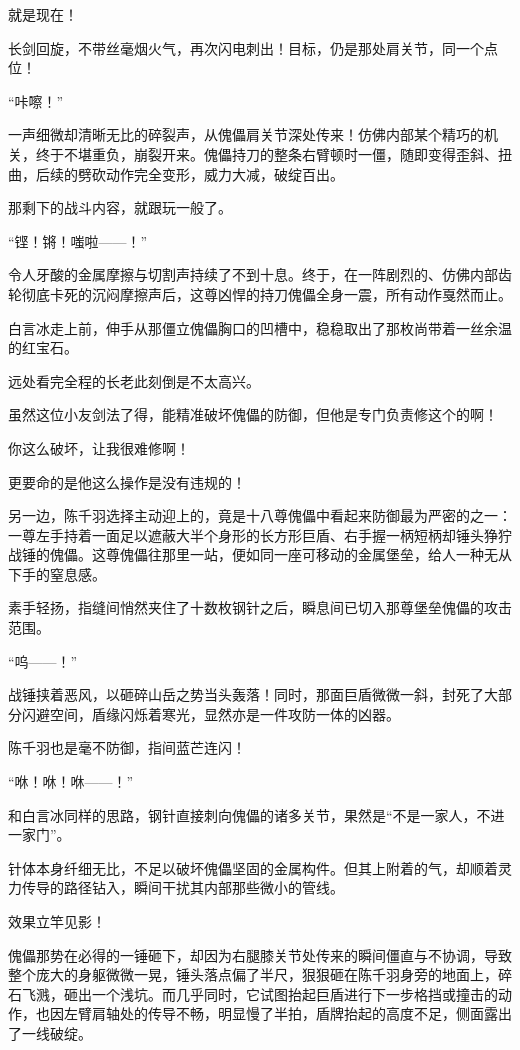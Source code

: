 就是现在！

长剑回旋，不带丝毫烟火气，再次闪电刺出！目标，仍是那处肩关节，同一个点位！

“咔嚓！”

一声细微却清晰无比的碎裂声，从傀儡肩关节深处传来！仿佛内部某个精巧的机关，终于不堪重负，崩裂开来。傀儡持刀的整条右臂顿时一僵，随即变得歪斜、扭曲，后续的劈砍动作完全变形，威力大减，破绽百出。

那剩下的战斗内容，就跟玩一般了。

“铿！锵！嗤啦——！”

令人牙酸的金属摩擦与切割声持续了不到十息。终于，在一阵剧烈的、仿佛内部齿轮彻底卡死的沉闷摩擦声后，这尊凶悍的持刀傀儡全身一震，所有动作戛然而止。

白言冰走上前，伸手从那僵立傀儡胸口的凹槽中，稳稳取出了那枚尚带着一丝余温的红宝石。

远处看完全程的长老此刻倒是不太高兴。

虽然这位小友剑法了得，能精准破坏傀儡的防御，但他是专门负责修这个的啊！

你这么破坏，让我很难修啊！

更要命的是他这么操作是没有违规的！

\vspace{2em}

另一边，陈千羽选择主动迎上的，竟是十八尊傀儡中看起来防御最为严密的之一：一尊左手持着一面足以遮蔽大半个身形的长方形巨盾、右手握一柄短柄却锤头狰狞战锤的傀儡。这尊傀儡往那里一站，便如同一座可移动的金属堡垒，给人一种无从下手的窒息感。

素手轻扬，指缝间悄然夹住了十数枚钢针之后，瞬息间已切入那尊堡垒傀儡的攻击范围。

“呜——！”

战锤挟着恶风，以砸碎山岳之势当头轰落！同时，那面巨盾微微一斜，封死了大部分闪避空间，盾缘闪烁着寒光，显然亦是一件攻防一体的凶器。

陈千羽也是毫不防御，指间蓝芒连闪！

“咻！咻！咻——！”

和白言冰同样的思路，钢针直接刺向傀儡的诸多关节，果然是“不是一家人，不进一家门”。

针体本身纤细无比，不足以破坏傀儡坚固的金属构件。但其上附着的气，却顺着灵力传导的路径钻入，瞬间干扰其内部那些微小的管线。

效果立竿见影！

傀儡那势在必得的一锤砸下，却因为右腿膝关节处传来的瞬间僵直与不协调，导致整个庞大的身躯微微一晃，锤头落点偏了半尺，狠狠砸在陈千羽身旁的地面上，碎石飞溅，砸出一个浅坑。而几乎同时，它试图抬起巨盾进行下一步格挡或撞击的动作，也因左臂肩轴处的传导不畅，明显慢了半拍，盾牌抬起的高度不足，侧面露出了一线破绽。

